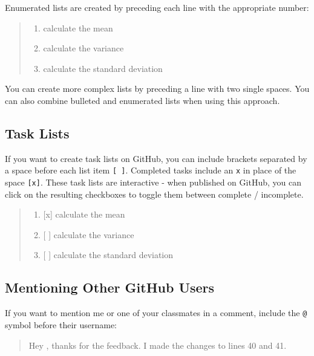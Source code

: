 \documentclass[]{book}
\providecommand{\tightlist}{%
  \setlength{\itemsep}{0pt}\setlength{\parskip}{0pt}}
\begin{document}
Enumerated lists are created by preceding each line with the appropriate
number:

\begin{quote}
\begin{enumerate}
\def\labelenumi{\arabic{enumi}.}
\tightlist
\item
  calculate the mean
\item
  calculate the variance
\item
  calculate the standard deviation
\end{enumerate}
\end{quote}

You can create more complex lists by preceding a line with two single
spaces. You can also combine bulleted and enumerated lists when using
this approach.

\subsection{Task Lists}\label{task-lists}

If you want to create task lists on GitHub, you can include brackets
separated by a space before each list item \texttt{{[}\ {]}}. Completed
tasks include an \texttt{x} in place of the space \texttt{{[}x{]}}.
These task lists are interactive - when published on GitHub, you can
click on the resulting checkboxes to toggle them between complete /
incomplete.

\begin{quote}
\begin{enumerate}
\def\labelenumi{\arabic{enumi}.}
\tightlist
\item
  {[}x{]} calculate the mean
\item
  {[} {]} calculate the variance
\item
  {[} {]} calculate the standard deviation
\end{enumerate}
\end{quote}

\subsection{Mentioning Other GitHub
Users}\label{mentioning-other-github-users}

If you want to mention me or one of your classmates in a comment,
include the \texttt{@} symbol before their username:

\begin{quote}
Hey \citet{chris-prener}, thanks for the feedback. I made the changes to
lines 40 and 41.
\end{quote}
\end{document}
